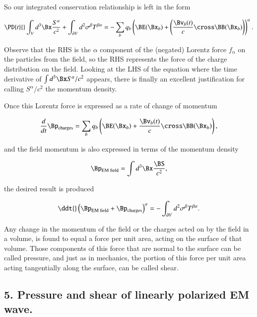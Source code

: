 So our integrated conservation relationship is left in the form

\begin{equation}\label{eqn:relativisticElectrodynamicsPS6P1:270}
\PD{t}{} \int_V d^3 \Bx \frac{S^\alpha}{c^2} 
+ 
\int_{\partial V} d^2 \sigma^\beta T^{\beta \alpha}
= -
\sum_b q_b \left( \BE(\Bx_b) + \left( \frac{\Bv_b(t)}{c} \cross \BB(\Bx_b) \right) \right)^\alpha .
\end{equation}

Observe that the RHS is the $\alpha$ component of the (negated) Lorentz force $f_\alpha$ on the particles from the field, so the RHS represents the force of the charge distribution on the field.  Looking at the LHS of the equation where the time derivative of $\int d^3\Bx S^\alpha/c^2$ appears, there is finally an excellent justification for calling $S^\alpha/c^2$ the momentum density.

Once this Lorentz force is expressed as a rate of change of momentum

\begin{equation}\label{eqn:relativisticElectrodynamicsPS6P1:290}
\frac{d}{dt} \Bp_{\text{charges}} = \sum_b q_b \left( \BE(\Bx_b) + \frac{\Bv_b(t)}{c} \cross \BB(\Bx_b) \right),
\end{equation}

and the field momentum is also expressed in terms of the momentum density

\begin{equation}\label{eqn:relativisticElectrodynamicsPS6P1:310}
\Bp_{\text{EM field}} = \int d^3 \Bx \frac{\BS}{c^2},
\end{equation}

the desired result is produced

\begin{equation}\label{eqn:relativisticElectrodynamicsPS6P1:330}
\ddt{} \left( \Bp_{\text{EM field}} + \Bp_{\text{charges}} \right)^\alpha = -\int_{\partial V} d^2 \sigma^\beta T^{\beta \alpha}.
\end{equation}

Any change in the momentum of the field or the charges acted on by the field in a volume, is found to equal a force per unit area, acting on the surface of that volume.  Those components of this force that are normal to the surface can be called pressure, and just as in mechanics, the portion of this force per unit area acting tangentially along the surface, can be called shear.

\subsection{5. Pressure and shear of linearly polarized EM wave.}

